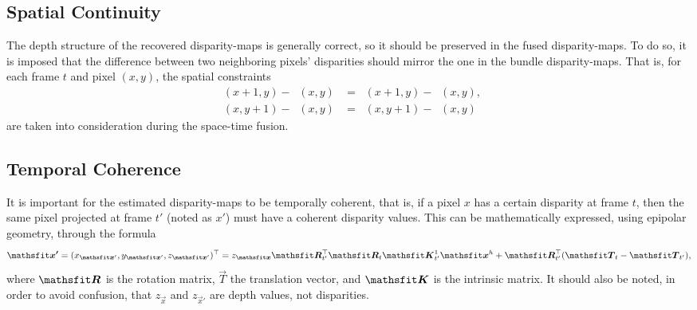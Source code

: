 {
	\newcommand{\D}[1]{\mathop{D_{#1}}}
	\newcommand{\Dstar}[1]{\mathop{D^*_{#1}}}
	
	\subsection{Spatial Continuity}
	The depth structure of the recovered disparity-maps is generally correct, so it should be preserved in the fused disparity-maps. To do so, it is imposed that the difference between two neighboring pixels' disparities should mirror the one in the bundle disparity-maps.
	That is, for each frame $t$ and pixel $(x,y)$, the spatial constraints
	\begin{align*}
	\Dstar{t}(x+1,y) - \Dstar{t}(x,y)&=\D{t}(x+1,y) - \D{t}(x,y),\\
	\Dstar{t}(x, y+1) - \Dstar{t}(x,y)&=\D{t}(x,y+1) - \D{t}(x,y)
	\end{align*}
	are taken into consideration during the space-time fusion. 
	
	\subsection{Temporal Coherence}
	It is important for the estimated disparity-maps to be temporally coherent, that is, if a pixel $x$ has a certain disparity at frame $t$, then the same pixel projected at frame $t'$ (noted as $x'$) must have a coherent disparity values. This can be mathematically expressed, using epipolar geometry, through the formula
	\begin{equation}\label{eq:conj_pixel}
	\vec{x'} = 
	\Transpose{(x_{\vec x'} , y_{\vec x'} , z_{\vec x'} )} = 
	z_{\vec x} \Transpose{\mat R_{t'}} \mat R_{t} \mat K^{1}_{t'} \vec{x}^h + 
	\Transpose{\mat R_{t'}}(\vec T_t - \vec T_{t'}),
	\end{equation}
	where $\mat R$ is the rotation matrix, $\vec T$ the translation vector, and $\mat K$ is the intrinsic matrix.  It should also be noted, in order to avoid confusion, that $z_{\vec x}$ and $z_{\vec x'}$ are depth values, not disparities.

}
